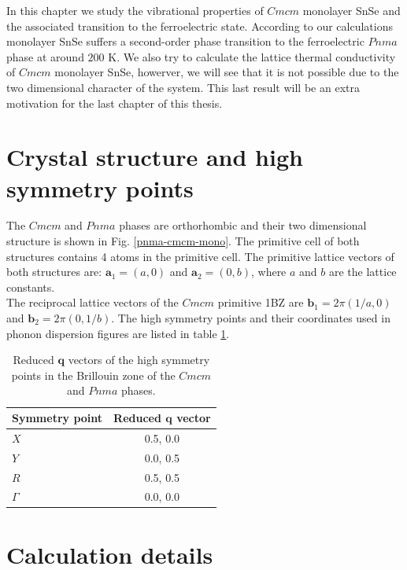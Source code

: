 In this chapter we study the vibrational properties of $Cmcm$ monolayer SnSe and the associated transition to the 
ferroelectric state. According to our calculations monolayer SnSe suffers a second-order phase transition to the 
ferroelectric $Pnma$ phase at around $200$ K. We also try to calculate the lattice thermal conductivity of $Cmcm$ 
monolayer SnSe, howerver, we will see that it is not possible due to the two dimensional character of the system. 
This last result will be an extra  motivation for the last chapter of this thesis.

\section{Crystal structure and high symmetry points}

The $Cmcm$ and $Pnma$ phases are orthorhombic and their two dimensional structure is shown in 
Fig. \ref{pnma-cmcm-mono}. The primitive cell of both structures contains 4 atoms in the primitive cell. The 
primitive lattice vectors of both structures are: $\mathbf{a}_{1}=(a,0)$ and $\mathbf{a}_{2}=(0,b)$, where $a$ and 
$b$ are the lattice constants. \\

The reciprocal lattice vectors of the $Cmcm$ primitive 1BZ are $\mathbf{b}_{1}=2\pi(1/a,0)$ and 
$\mathbf{b}_{2}=2\pi(0,1/b)$. The high symmetry points and their coordinates used in phonon dispersion figures are 
listed in table \ref{qpoints-mono}.
\begin{table}
\begin{center}
\begin{tabular*}{0.45\textwidth}{l c}
 \hline
 \hline
             Symmetry point  & Reduced $\mathbf{q}$ vector  \\
 \hline
 $X$                  &  0.5, 0.0 \\
 $Y$                  &  0.0, 0.5 \\
 $R$                  &  0.5, 0.5  \\
 $\Gamma$             &  0.0, 0.0  \\
 \hline
 \hline
\end{tabular*}
\end{center}
\caption{Reduced $\mathbf{q}$ vectors of the high symmetry points in the Brillouin zone of the $Cmcm$ and $Pnma$ 
phases.}
\label{qpoints-mono}
\end{table}

\section{Calculation details}

